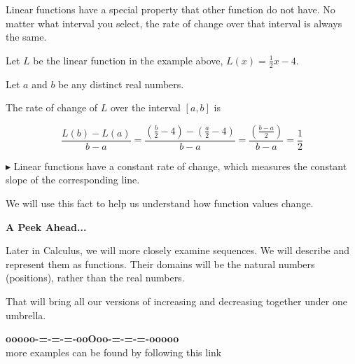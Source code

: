 \documentclass{ximera}
\begin{document}
Linear functions have a special property that other function do not have.  No matter what interval you select, the rate of change over that interval is always the same. 



Let $L$ be the linear function in the example above, $L(x) = \frac{1}{2} x - 4$. 

Let $a$ and $b$ be any distinct real numbers. 

The rate of change of $L$ over the interval $[a, b]$ is


\[
\frac{L(b) - L(a)}{b - a} = \frac{\left( \frac{b}{2} - 4 \right) - \left( \frac{a}{2} - 4 \right)}{b-a} 
= \frac{\left( \frac{b - a}{2} \right)}{b-a} = \frac{1}{2}
\]



\textbf{\textcolor{blue!55!black}{$\blacktriangleright$}} Linear functions have a constant rate of change, which measures the constant slope of the corresponding line. 



We will use this fact to help us understand how function values change.



\textbf{\textcolor{red!70!black}{A Peek Ahead...}}



Later in Calculus, we will more closely examine sequences.  We will describe and represent them as functions.  Their domains will be the natural numbers (positions), rather than the real numbers. 


That will bring all our versions of increasing and decreasing together under one umbrella.
































\begin{onlineOnly}
\begin{center}
\textbf{\textcolor{green!50!black}{ooooo-=-=-=-ooOoo-=-=-=-ooooo}} \\

more examples can be found by following this link\\ 

\end{center}
\end{onlineOnly}
\end{document}
